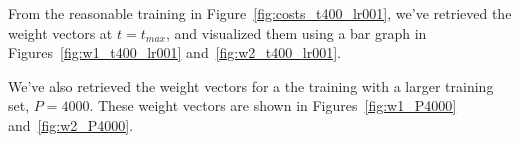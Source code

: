 From the reasonable training in Figure~\ref{fig:costs_t400_lr001}, we've retrieved the weight vectors at \(t = t_{max}\), and visualized them using a bar graph in Figures~\ref{fig:w1_t400_lr001} and~\ref{fig:w2_t400_lr001}.


We've also retrieved the weight vectors for a the training with a larger training set, \(P = 4000\).
These weight vectors are shown in Figures~\ref{fig:w1_P4000} and~\ref{fig:w2_P4000}.

